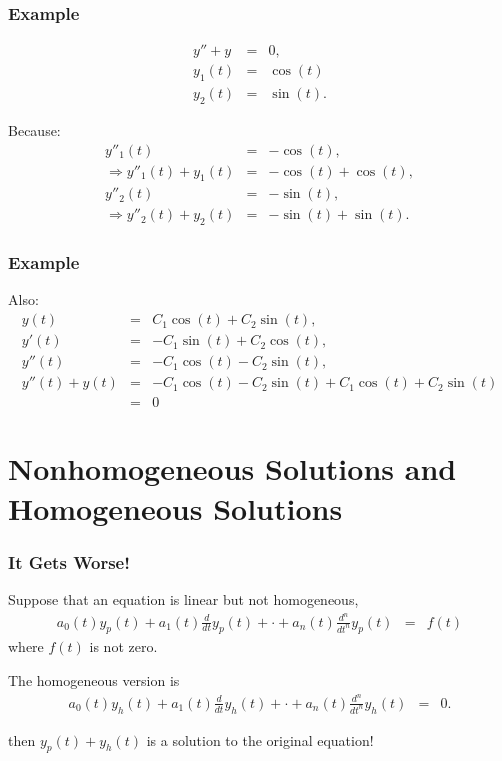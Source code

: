 \begin{frame}
  \frametitle{Example}

  \begin{eqnarray*}
    y'' + y & = & 0, \\
    y_1(t) & = & \cos(t) \\
    y_2(t) & = & \sin(t).
  \end{eqnarray*}

  Because:
  \begin{eqnarray*}
    y''_1(t) & = & -\cos(t), \\
    \Rightarrow y''_1(t) + y_1(t) & = & -\cos(t)+\cos(t), \\
    y''_2(t) & = & -\sin(t), \\
    \Rightarrow y''_2(t) + y_2(t) & = & -\sin(t)+\sin(t).
  \end{eqnarray*}

\end{frame}

\begin{frame}
  \frametitle{Example}

  Also:
  \begin{eqnarray*}
    y(t) & = & C_1 \cos(t) + C_2 \sin(t), \\
    y'(t) & = & -C_1 \sin(t) + C_2 \cos(t), \\
    y''(t) & = & -C_1 \cos(t) - C_2 \sin(t), \\
    y''(t) + y(t) & = & -C_1 \cos(t) - C_2 \sin(t) + C_1 \cos(t) + C_2 \sin(t) \\
    & = & 0
  \end{eqnarray*}


\end{frame}


\section{Nonhomogeneous Solutions and Homogeneous Solutions}


\begin{frame}
  \frametitle{It Gets Worse!}

  Suppose that an equation is linear but not homogeneous,
  \begin{eqnarray*}
    a_0(t) y_p(t) + a_1(t) \frac{d}{dt} y_p(t) + \cdot + a_n(t) \frac{d^n}{dt^n} y_p(t) & = & f(t)
  \end{eqnarray*}
  where $f(t)$ is not zero.

  The homogeneous version is 
  \begin{eqnarray*}
    a_0(t) y_h(t) + a_1(t) \frac{d}{dt} y_h(t) + \cdot + a_n(t) \frac{d^n}{dt^n} y_h(t) & = & 0.
  \end{eqnarray*}

  then $y_p(t)+y_h(t)$ is a solution to the original equation!


\end{frame}


